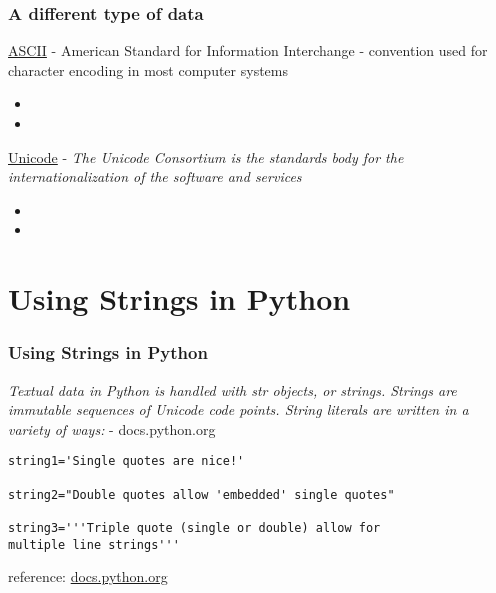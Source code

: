 \documentclass[fleqn]{beamer} %
\newcommand{\sectiontitleI}{A different type of data} %
\newcommand{\sectiontitleII}{Using Strings in Python }
\begin{document}
	\begin{frame} \small
		\frametitle{\sectiontitleI}
		
		\href{https://www.asciitable.com/}{ASCII} - American Standard for Information Interchange - convention used for character encoding in most computer systems

		\begin{itemize}
			\item
			\item
		\end{itemize}

		\href{https://home.unicode.org/}{Unicode} - {\it The Unicode Consortium is the standards body for the internationalization of the software and services}   

		\begin{itemize}
			\item
			\item
		\end{itemize}
		
	\end{frame}



\section{\sectiontitleII}

	\begin{frame}[label=sectionII, containsverbatim] \small
		\frametitle{\sectiontitleII}
		
		{\it Textual data in Python is handled with str objects, or strings. Strings are immutable sequences of Unicode code points. String literals are written in a variety of ways:} - docs.python.org

		\begin{lstlisting}
string1='Single quotes are nice!'

string2="Double quotes allow 'embedded' single quotes" 

string3='''Triple quote (single or double) allow for
multiple line strings'''
		\end{lstlisting}


		\tiny{reference: \href{https://docs.python.org/3/library/stdtypes.html#textseq}{docs.python.org}}
	
	\end{frame}
\end{document}
